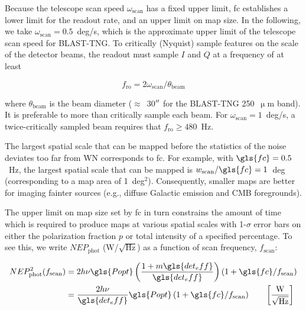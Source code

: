 Because the telescope scan speed $\omega_{\mathrm{scan}}$ has a fixed upper limit, \gls{fc} establishes a lower limit for the readout rate, and an upper limit on map size. In the following, we take $\omega_{\mathrm{scan}} = 0.5$~deg/s, which is the approximate upper limit of the telescope scan speed for BLAST-TNG\@. To critically (Nyquist) sample features on the scale of the detector beams, the readout must sample $I$ and $Q$ at a frequency of at least

\begin{equation}\label{eq:readout rate}
  f_{\mathrm{ro}} = 2 \omega_{\mathrm{scan}} / \theta_{\mathrm{beam}}
\end{equation}

where $\theta_{\mathrm{beam}}$ is the beam diameter ($\approx$~30$\operatorname{^{\prime\prime}}$ for the BLAST-TNG 250~$\upmu$m band). It is preferable to more than critically sample each beam. For $\omega_{\mathrm{scan}} = 1$~deg/s, a twice-critically sampled beam requires that $f_{\mathrm{ro}} \geq 480$~Hz.

The largest spatial scale that can be mapped before the statistics of the noise deviates too far from WN corresponds to \gls{fc}. For example, with $\gls{fc} = 0.5$~Hz, the largest spatial scale that can be mapped is $w_{\mathrm{scan}} / \gls{fc} = 1$~deg (corresponding to a map area of 1~deg$^{2}$). Consequently, smaller maps are better for imaging fainter sources (e.g., diffuse Galactic emission and CMB foregrounds).

The upper limit on map size set by \gls{fc} in turn constrains the amount of time which is required to produce maps at various spatial scales with 1-$\sigma$ error bars on either the polarization fraction $p$ or total intensity of a specified percentage. To see this, we write $NEP_{\mathrm{phot}}$ (W/$\sqrt{\mathrm{Hz}}$) as a function of scan frequency, $f_{\mathrm{scan}}$:

\begin{equation}\label{eq:nep flicker}
  \begin{aligned}
  NEP_{\mathrm{phot}}^{2}(f_{\mathrm{scan}}) &= 2 h \nu \gls{Popt} \left( \frac{1 + m \gls{det_eff}}{\gls{det_eff}}\right) \left(1 + \gls{fc}/f_{\mathrm{scan}} \right) \\
          &= \frac{2 h \nu}{ \gls{det_eff} } \gls{Popt} \left( 1 + \gls{fc}/f_{\mathrm{scan}} \right) \qquad \left[ \frac{ \mathrm{W} }{ \sqrt{\mathrm{Hz}} } \right]
  \end{aligned}
\end{equation}

